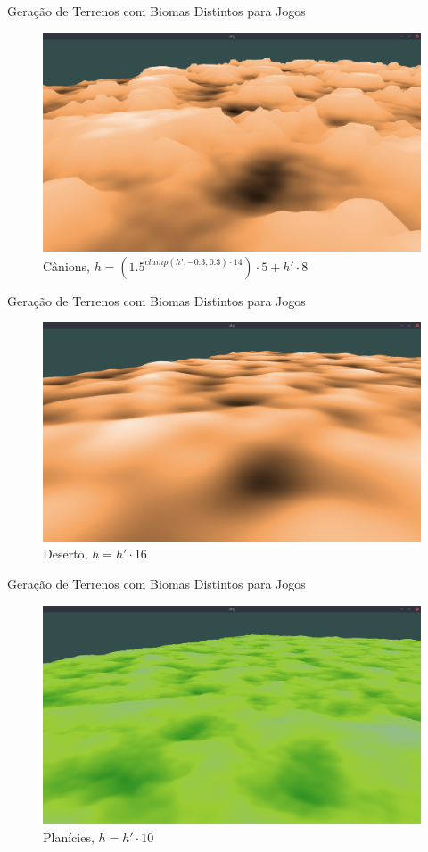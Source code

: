 \begin{frame}{Geração de Terrenos com Biomas Distintos para Jogos}
    \begin{figure}
		\centering
        \includegraphics[width=.8\textwidth]{img/uffs/bssCanyons.png}
        \caption{Cânions, $h = (1.5^{clamp(h', -0.3, 0.3) \cdot 14}) \cdot 5 + h' \cdot 8$}
    \end{figure}
\end{frame}

\begin{frame}{Geração de Terrenos com Biomas Distintos para Jogos}
    \begin{figure}
		\centering
        \includegraphics[width=.8\textwidth]{img/uffs/bssDesert.png}
        \caption{Deserto, $h = h' \cdot 16$}
    \end{figure}
\end{frame}

\begin{frame}{Geração de Terrenos com Biomas Distintos para Jogos}
    \begin{figure}
		\centering
        \includegraphics[width=.8\textwidth]{img/uffs/bssPlains.png}
        \caption{Planícies, $h = h' \cdot 10$}
    \end{figure}
\end{frame}

